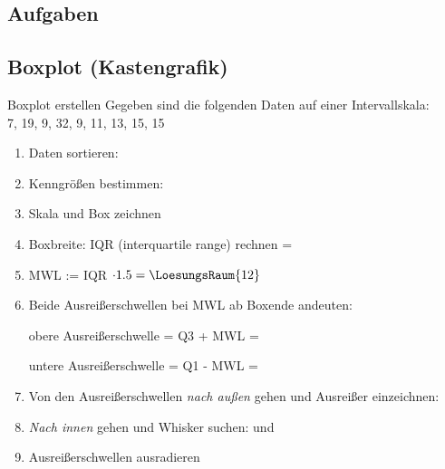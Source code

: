 \subsection*{Aufgaben}


  


\newpage

\subsection{Boxplot (Kastengrafik)}

\begin{beispiel}{Boxplot erstellen}{}
  Gegeben sind die folgenden Daten auf einer Intervallskala:\\
  7, 19, 9, 32, 9, 11, 13, 15, 15
\end{beispiel}

\begin{enumerate}

\item Daten sortieren: 

\item Kenngrößen bestimmen: 

\item Skala und Box zeichnen

\item Boxbreite: IQR (interquartile range) rechnen =
\item MWL := IQR $\cdot{} 1.5 = \LoesungsRaum{12}$
  
\item Beide Ausreißerschwellen bei MWL ab Boxende andeuten:

  obere Ausreißerschwelle = Q3 + MWL = 

  untere Ausreißerschwelle = Q1 - MWL = 

  \item Von den Ausreißerschwellen \textit{nach außen} gehen und
    Ausreißer einzeichnen: 

  \item \textit{Nach innen} gehen und Whisker suchen:
     und 
    
  \item Ausreißerschwellen ausradieren
\end{enumerate}


